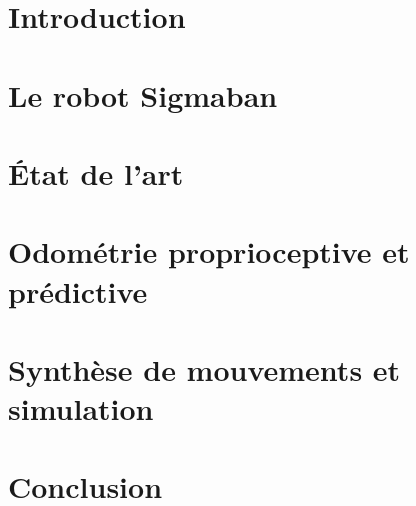 \documentclass[a4paper,12pt,french]{book}
\theoremstyle{plain}
\theoremstyle{definition}
\begin{document}
\chapter{Introduction}



\chapter{Le robot Sigmaban}







\chapter{État de l'art}



\chapter{Odométrie proprioceptive et prédictive}







\chapter{Synthèse de mouvements et simulation}





%

\chapter{Conclusion}





\appendix


\backmatter




\end{document}
